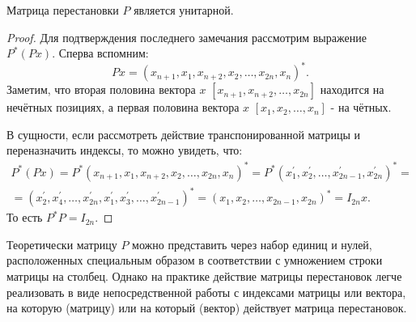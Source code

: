 \begin{claim} \label{P-unitary}
    Матрица перестановки \(P\) является унитарной.
\end{claim}
\begin{proof}
    Для подтверждения последнего замечания рассмотрим выражение \(P^*(Px)\). Сперва вспомним: 
    \begin{equation}
        Px=(x_{n+1},x_1, x_{n+2},x_2,\dots,x_{2n},x_n)^*.
    \end{equation}
    Заметим, что вторая половина вектора \(x\) \([x_{n+1},x_{n+2},\dots,x_{2n}]\) находится на нечётных позициях, а первая половина вектора  \(x\) \([x_{1},x_{2},\dots,x_{n}]\) - на чётных. 

    В сущности, если рассмотреть действие транспонированной матрицы и переназначить индексы, то можно увидеть, что:
    \begin{equation*}
        \begin{split}
            P^*(Px)=P^*(x_{n+1},x_1, x_{n+2},x_2,\dots,x_{2n},x_n)^*=P^*(x_{1}^\prime,x_2^\prime,\dots,x_{2n-1}^\prime,x_{2n}^\prime)^*=\\[6pt]=(x_2^\prime,x_4^\prime,\dots,x_{2n}^\prime,x_1^\prime,x_3^\prime,\dots,x_{2n-1}^\prime)^*=(x_{1},x_2,\dots,x_{2n-1},x_{2n})^*=I_{2n}x. 
        \end{split}
    \end{equation*}
    То есть \(P^*P=I_{2n}\).
\end{proof}

\begin{note}
    Теоретически матрицу \(P\) можно представить через набор единиц и нулей, расположенных специальным образом в соответствии с умножением строки матрицы на столбец. Однако на практике действие матрицы перестановок легче реализовать в виде непосредственной работы с индексами матрицы или вектора, на которую (матрицу) или на который (вектор) действует матрица перестановок.   
\end{note}

